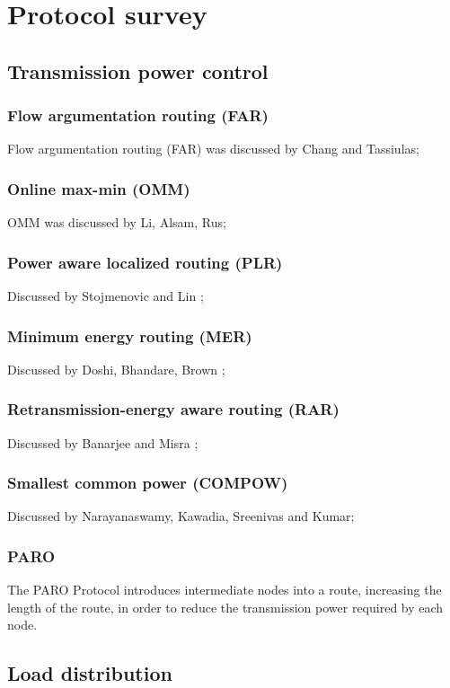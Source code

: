 \documentclass[conference]{IEEEtran}
\begin{document}
\section{Protocol survey}
\subsection{Transmission power control}
\subsubsection{Flow argumentation routing (FAR)}
Flow argumentation routing (FAR) was discussed by Chang and Tassiulas\cite{chang2000energy};
\subsubsection{Online max-min (OMM)}
OMM was discussed by Li, Alsam, Rus\cite{li2001online};
\subsubsection{Power aware localized routing (PLR)}
Discussed by Stojmenovic and Lin \cite{stojmenovic2001power};
\subsubsection{Minimum energy routing (MER)}
Discussed by Doshi, Bhandare, Brown \cite{doshi2002demand};
\subsubsection{Retransmission-energy aware routing (RAR)}
Discussed by Banarjee and Misra \cite{banerjee2002minimum};
\subsubsection{Smallest common power (COMPOW)}
Discussed by Narayanaswamy, Kawadia, Sreenivas and Kumar\cite{narayanaswamy2002power};

\subsubsection{PARO}
The PARO Protocol\cite{gomez2003paro} introduces intermediate nodes into a
route, increasing the length of the route, in order to reduce the transmission
power required by each node.

\subsection{Load distribution}
\end{document}

